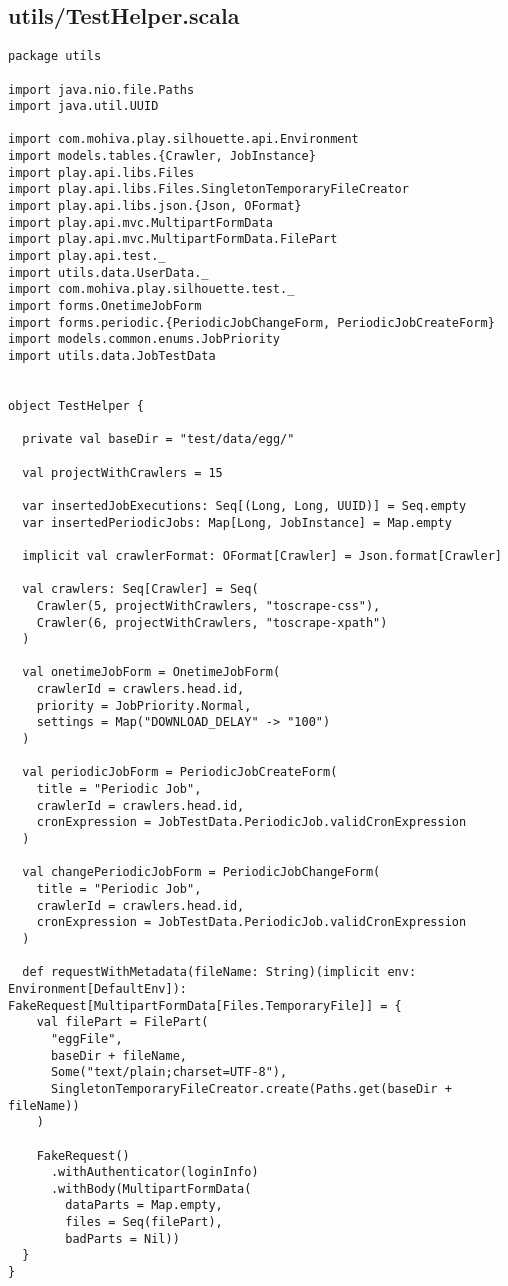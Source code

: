 \subsection{utils/TestHelper.scala}
\begin{lstlisting}
package utils

import java.nio.file.Paths
import java.util.UUID

import com.mohiva.play.silhouette.api.Environment
import models.tables.{Crawler, JobInstance}
import play.api.libs.Files
import play.api.libs.Files.SingletonTemporaryFileCreator
import play.api.libs.json.{Json, OFormat}
import play.api.mvc.MultipartFormData
import play.api.mvc.MultipartFormData.FilePart
import play.api.test._
import utils.data.UserData._
import com.mohiva.play.silhouette.test._
import forms.OnetimeJobForm
import forms.periodic.{PeriodicJobChangeForm, PeriodicJobCreateForm}
import models.common.enums.JobPriority
import utils.data.JobTestData


object TestHelper {

  private val baseDir = "test/data/egg/"

  val projectWithCrawlers = 15

  var insertedJobExecutions: Seq[(Long, Long, UUID)] = Seq.empty
  var insertedPeriodicJobs: Map[Long, JobInstance] = Map.empty

  implicit val crawlerFormat: OFormat[Crawler] = Json.format[Crawler]

  val crawlers: Seq[Crawler] = Seq(
    Crawler(5, projectWithCrawlers, "toscrape-css"),
    Crawler(6, projectWithCrawlers, "toscrape-xpath")
  )

  val onetimeJobForm = OnetimeJobForm(
    crawlerId = crawlers.head.id,
    priority = JobPriority.Normal,
    settings = Map("DOWNLOAD_DELAY" -> "100")
  )

  val periodicJobForm = PeriodicJobCreateForm(
    title = "Periodic Job",
    crawlerId = crawlers.head.id,
    cronExpression = JobTestData.PeriodicJob.validCronExpression
  )

  val changePeriodicJobForm = PeriodicJobChangeForm(
    title = "Periodic Job",
    crawlerId = crawlers.head.id,
    cronExpression = JobTestData.PeriodicJob.validCronExpression
  )

  def requestWithMetadata(fileName: String)(implicit env: Environment[DefaultEnv]): FakeRequest[MultipartFormData[Files.TemporaryFile]] = {
    val filePart = FilePart(
      "eggFile",
      baseDir + fileName,
      Some("text/plain;charset=UTF-8"),
      SingletonTemporaryFileCreator.create(Paths.get(baseDir + fileName))
    )

    FakeRequest()
      .withAuthenticator(loginInfo)
      .withBody(MultipartFormData(
        dataParts = Map.empty,
        files = Seq(filePart),
        badParts = Nil))
  }
}
\end{lstlisting}

